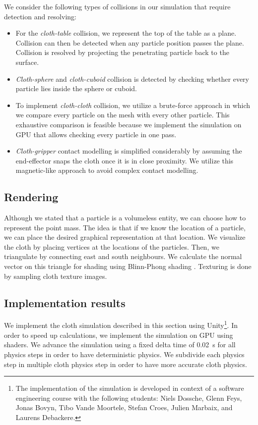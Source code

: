 \documentclass[\home/main.tex]{subfiles}
\begin{document}
We consider the following types of collisions in our simulation that require detection and resolving:
\begin{itemize}
    \item For the \emph{cloth-table} collision, we represent the top of the table as a plane. Collision can then be detected when any particle position passes the plane. Collision is resolved by projecting the penetrating particle back to the surface.
    \item \emph{Cloth-sphere} and \emph{cloth-cuboid} collision is detected by checking whether every particle lies inside the sphere or cuboid.
    \item To implement \emph{cloth-cloth} collision, we utilize a brute-force approach in which we compare every particle on the mesh with every other particle. This exhaustive comparison is feasible because we implement the simulation on GPU that allows checking every particle in one pass.
    \item \emph{Cloth-gripper} contact modelling is simplified considerably by assuming the end-effector snaps the cloth once it is in close proximity. We utilize this magnetic-like approach to avoid complex contact modelling.
\end{itemize}

\subsection{Rendering}
Although we stated that a particle is a volumeless entity, we can choose how to represent the point mass. The idea is that if we know the location of a particle, we can place the desired graphical representation at that location. We visualize the cloth by placing vertices at the locations of the particles. Then, we triangulate by connecting east and south neighbours. We calculate the normal vector on this triangle for shading using Blinn-Phong shading \autocite{Blinn1977}. Texturing is done by sampling cloth texture images.

\subsection{Implementation results}

We implement the cloth simulation described in this section using Unity\footnote{The implementation of the simulation is developed in context of a software engineering course with the following students: Niels Dossche, Glenn Feys, Jonas Bovyn, Tibo Vande Moortele, Stefan Croes, Julien Marbaix, and Laurens Debackere.}. In order to speed up calculations, we implement the simulation on GPU using shaders. We advance the simulation using a fixed delta time of \qty{0.02}{\second} for all physics steps in order to have deterministic physics. We subdivide each physics step in multiple cloth physics step in order to have more accurate cloth physics.
\end{document}
